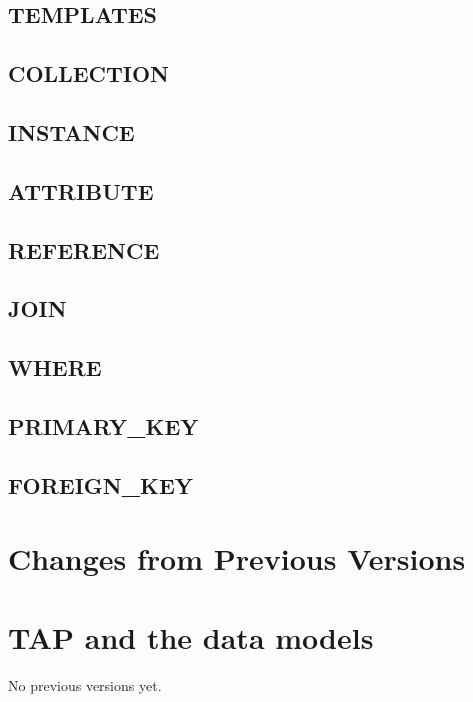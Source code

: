 \documentclass[11pt,a4paper]{ivoa}
\begin{document}
\subsection{TEMPLATES}

\FloatBarrier

\subsection{COLLECTION}

\FloatBarrier

\subsection{INSTANCE}

\FloatBarrier

\subsection{ATTRIBUTE}

\FloatBarrier

\subsection{REFERENCE}

\FloatBarrier

\subsection{JOIN}

\FloatBarrier

\subsection{WHERE}

\FloatBarrier

\subsection{PRIMARY\_KEY}

\FloatBarrier

\subsection{FOREIGN\_KEY}

\FloatBarrier

\pagebreak
\section{Changes from Previous Versions}

\pagebreak
\appendix 
\section{TAP and the data models}


No previous versions yet.  



\end{document}
